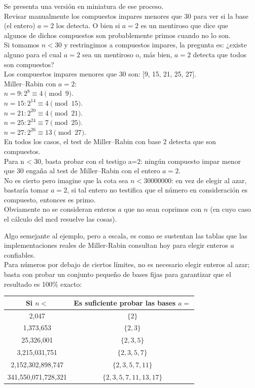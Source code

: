 \begin{ejemplo}
Se presenta una versión en miniatura de ese proceso. \\
Revisar manualmente los compuestos impares menores que 30 para ver si la base (el entero) $a=2$ los detecta. O bien si $a=2$ es un mentiroso que dice que algunos de dichos compuestos son probablemente primos cuando no lo son. \\
Si tomamos $n < 30$ y restringimos a compuestos impares, la pregunta es: ¿existe alguno para el cual $a=2$ sea un mentiroso o, más bien, $a=2$ detecta que todos son compuestos?  \\
Los compuestos impares menores que 30 son: [9, 15, 21, 25, 27]. \\
Miller–Rabin con $a=2$: \\  
$n=9: 2^8 \equiv 4 \pmod {9}$.  \\
$n=15: 2^{14} \equiv 4 \pmod {15}$. \\  
$n=21: 2^{20} \equiv 4 \pmod {21}$.  \\
$n=25: 2^{24} \equiv 7 \pmod {25}$.  \\
$n=27: 2^{26} \equiv 13 \pmod {27}$.  \\
En todos los casos, el test de Miller–Rabin con base 2 detecta que son compuestos. \\
Para n < 30, basta probar con el testigo a=2: ningún compuesto impar menor que 30 engaña al test de Miller–Rabin con el entero $a=2$.   \\
No es cierto pero imagine que la cota sea $n<30000000$: en vez de elegir al azar, bastaría tomar $a=2$, si tal entero no testifica que el número en consideración es compuesto, entonces es primo. \\
Obviamente no se consideran enteros $a$ que no sean coprimos con $n$ (en cuyo caso el cálculo del mcd resuelve las cosas). \\
\end{ejemplo}

Algo semejante al ejemplo, pero a escala, es como se sustentan las tablas que las implementaciones reales de Miller-Rabin consultan hoy para elegir enteros $a$ confiables. \\

Para números por debajo de ciertos límites, no es necesario elegir enteros al azar; basta con probar un conjunto pequeño de bases fijas para garantizar que el resultado es 100\% exacto:
\begin{tabular}{c|c}
   Si $n <$  &  Es suficiente probar las bases $a =$  \\
   \hline
 2,047 & $\{2\}$ \\
1,373,653 & $\{2, 3\}$ \\
25,326,001 & $\{2, 3, 5\}$ \\
3,215,031,751 & $\{2, 3, 5, 7\}$ \\
2,152,302,898,747 & $\{2, 3, 5, 7, 11\}$ \\
341,550,071,728,321 & $\{2, 3, 5, 7, 11, 13, 17\}$ \\
\hline
\end{tabular}

